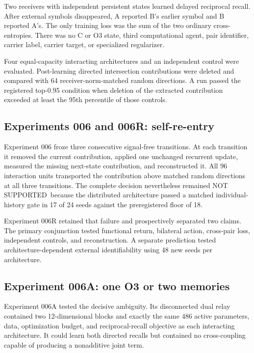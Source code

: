 \documentclass[11pt,a4paper]{article}
\newcommand{\statusnotsupported}{\textsf{NOT SUPPORTED}}
\begin{document}
Two receivers with independent persistent states learned delayed reciprocal recall. After external symbols disappeared, A reported B's earlier symbol and B reported A's. The only training loss was the sum of the two ordinary cross-entropies. There was no C or O3 state, third computational agent, pair identifier, carrier label, carrier target, or specialized regularizer.

Four equal-capacity interacting architectures and an independent control were evaluated. Post-learning directed intersection contributions were deleted and compared with 64 receiver-norm-matched random directions. A run passed the registered top-0.95 condition when deletion of the extracted contribution exceeded at least the 95th percentile of those controls.

\subsection{Experiments 006 and 006R: self-re-entry}

Experiment 006 froze three consecutive signal-free transitions. At each transition it removed the current contribution, applied one unchanged recurrent update, measured the missing next-state contribution, and reconstructed it. All 96 interaction units transported the contribution above matched random directions at all three transitions. The complete decision nevertheless remained \statusnotsupported\ because the distributed architecture passed a matched individual-history gate in 17 of 24 seeds against the preregistered floor of 18.

Experiment 006R retained that failure and prospectively separated two claims. The primary conjunction tested functional return, bilateral action, cross-pair loss, independent controls, and reconstruction. A separate prediction tested architecture-dependent external identifiability using 48 new seeds per architecture.

\subsection{Experiment 006A: one O3 or two memories}

Experiment 006A tested the decisive ambiguity. Its disconnected dual relay contained two 12-dimensional blocks and exactly the same 486 active parameters, data, optimization budget, and reciprocal-recall objective as each interacting architecture. It could learn both directed recalls but contained no cross-coupling capable of producing a nonadditive joint term.
\end{document}

